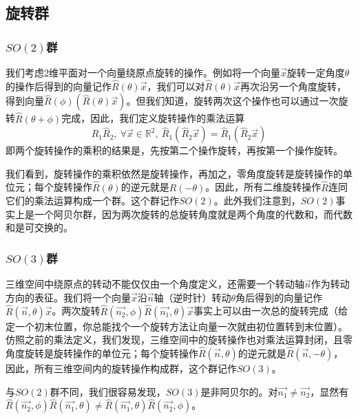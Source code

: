 \documentclass[a4paper,11pt]{ctexart}
\newcommand{\beq}{\begin{equation}}
\newcommand{\eeq}{\end{equation}}
\newcommand{\reals}{\mathbb{R}}
\begin{document}
\subsection{旋转群}
\subsubsection{$SO(2)$群}
我们考虑2维平面对一个向量绕原点旋转的操作。例如将一个向量$\vec{x}$旋转一定角度$\theta$的操作后得到的向量记作$\hat{R}(\theta) \vec{x}$，我们可以对$\hat{R}(\theta) \vec{x}$再次沿另一个角度旋转，得到向量$\hat{R}(\phi) (\hat{R}(\theta) \vec{x})$。但我们知道，旋转两次这个操作也可以通过一次旋转$\hat{R}(\theta + \phi)$完成，因此，我们定义旋转操作的乘法运算
\beq
\hat{R}_1 \hat{R}_2, \ \forall \vec{x}\in \reals^2,\ \hat{R}_1 (\hat{R}_2 \vec{x}) = \hat{R}_1 (\hat{R}_2 \vec{x})
\eeq
即两个旋转操作的乘积的结果是，先按第二个操作旋转，再按第一个操作旋转。
\par
我们看到，旋转操作的乘积依然是旋转操作，再加之，零角度旋转是旋转操作的单位元；每个旋转操作$\hat{R}(\theta)$的逆元就是$\hat{R}(-\theta)$。因此，所有二维旋转操作$\hat{R}$连同它们的乘法运算构成一个群。这个群记作$SO(2)$。此外我们注意到，$SO(2)$事实上是一个阿贝尔群，因为两次旋转的总旋转角度就是两个角度的代数和，而代数和是可交换的。
\subsubsection{$SO(3)$群}
三维空间中绕原点的转动不能仅仅由一个角度定义，还需要一个转动轴$\vec{n}$作为转动方向的表征。我们将一个向量$\vec{x}$沿$\vec{n}$轴（逆时针）转动$\theta$角后得到的向量记作$\hat{R}(\vec{n},\theta) \vec{x}$。两次旋转$\hat{R}(\vec{n_2},\phi) \hat{R}(\vec{n_1},\theta) \vec{x}$事实上可以由一次总的旋转完成（给定一个初末位置，你总能找个一个旋转方法让向量一次就由初位置转到末位置）。仿照之前的乘法定义，我们发现，三维空间中的旋转操作也对乘法运算封闭，且零角度旋转是旋转操作的单位元；每个旋转操作$\hat{R}(\vec{n},\theta)$的逆元就是$\hat{R}(\vec{n},-\theta)$，因此，所有三维空间内的旋转操作构成群，这个群记作$SO(3)$。\par
与$SO(2)$群不同，我们很容易发现，$SO(3)$是非阿贝尔的。对$\vec{n_1} \not= \vec{n_2}$，显然有$\hat{R}(\vec{n_2},\phi) \hat{R}(\vec{n_1},\theta) \not=  \hat{R}(\vec{n_1},\theta) \hat{R}(\vec{n_2},\phi)$。
\end{document}
